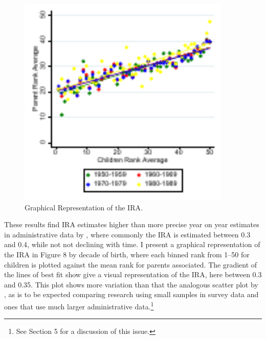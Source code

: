 \documentclass[notitlepage,12pt]{article}
\begin{document}
\begin{figure}[H]
  \centering
  \caption{Graphical Representation of the IRA.}
  \includegraphics[width=4in]{Graph16.pdf}
\end{figure}

These results find IRA estimates higher than more precise year on year estimates in administrative data by \cite{chetty2014united}, where commonly the IRA is estimated between 0.3 and 0.4, while not not declining with time.  I present a graphical representation of the IRA in Figure 8 by decade of birth, where each binned rank from 1--50 for children is plotted against the mean rank for parents associated.  The gradient of the lines of best fit show give a visual representation of the IRA, here between 0.3 and 0.35.  This plot shows more variation than that the analogous scatter plot by \cite{chetty2014united}, as is to be expected comparing research using small samples in survey data and ones that use much larger administrative data.\footnote{See Section 5 for a discussion of this issue.}
\end{document}
